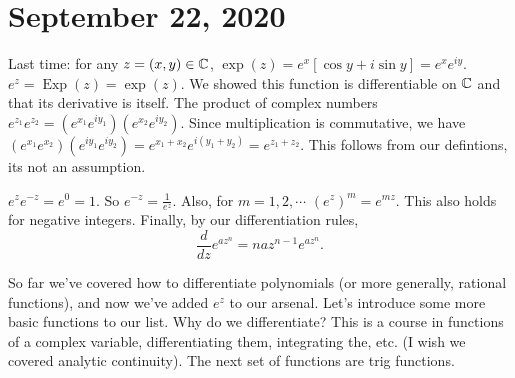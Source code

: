 \section{September 22, 2020}
Last time: for any $z=(x,y)\in \mathbb{C}$, $\exp(z)=e^{x}[\cos y+i\sin y]=e^{x}e^{iy}$. $e^{z}=\operatorname{Exp}(z)=\exp(z)$. We showed this function is differentiable on $\mathbb{C}$ and that its derivative is itself.
\orbreak
The product of complex numbers $e^{z_1}e^{z_2}=(e^{x_1}e^{iy_1})(e^{x_2}e^{iy_2})$. Since multiplication is commutative, we have $(e^{x_1}e^{x_2})(e^{iy_1}e^{iy_2})=e^{x_1+x_2}e^{i(y_1+y_2)}=e^{z_1+z_2}$. This follows from our defintions, its not an assumption.
\begin{cor}
    $e^{z}e^{-z}=e^0=1$. So $e^{-z}=\frac{1}{e^{z}}$. Also, for $m=1,2,\cdots$  $(e^{z})^m=e^{mz}$. This also holds for negative integers. Finally, by our differentiation rules, \[
    \frac{d}{dz} e^{az^n}=naz^{n-1}e^{az^n}.
    \] 
\end{cor}
So far we've covered how to differentiate polynomials (or more generally, rational functions), and now we've added $e^{z}$ to our arsenal. Let's introduce some more basic functions to our list. Why do we differentiate? This is a course in functions of a complex variable, differentiating them, integrating the, etc. (I wish we covered analytic continuity). The next set of functions are trig functions. 

